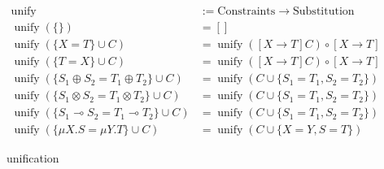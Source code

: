 \documentclass[a4j, dvipdfmx]{jsarticle}
\theoremstyle{definition}
\newcommand{\unify}{\mathop{\mathrm{unify}}\nolimits}
\begin{document}
\begin{figure}[H]
  \begin{align*}
    \unify                                                   &:= \text{Constraints} \rightarrow \text{Substitution} \\
    \unify(\{\})                                             &= [] \\
    \unify(\{X = T\} \cup C)                                 &= \unify([X \rightarrow T]C) \circ [X \rightarrow T] \\
    \unify(\{T = X\} \cup C)                                 &= \unify([X \rightarrow T]C) \circ [X \rightarrow T] \\
    \unify(\{S_1 \oplus S_2 = T_1 \oplus T_2\} \cup C)       &= \unify(C \cup \{S_1 = T_1, S_2 = T_2\}) \\
    \unify(\{S_1 \otimes S_2 = T_1 \otimes T_2\} \cup C)     &= \unify(C \cup \{S_1 = T_1, S_2 = T_2\}) \\
    \unify(\{S_1 \multimap S_2 = T_1 \multimap T_2\} \cup C) &= \unify(C \cup \{S_1 = T_1, S_2 = T_2\}) \\
    \unify(\{\mu{X}.S = \mu{Y}.T\} \cup C)                   &= \unify(C \cup \{X = Y, S = T\})
  \end{align*}
  \caption{unification}
  \label{fig:unification}
\end{figure}
\end{document}
